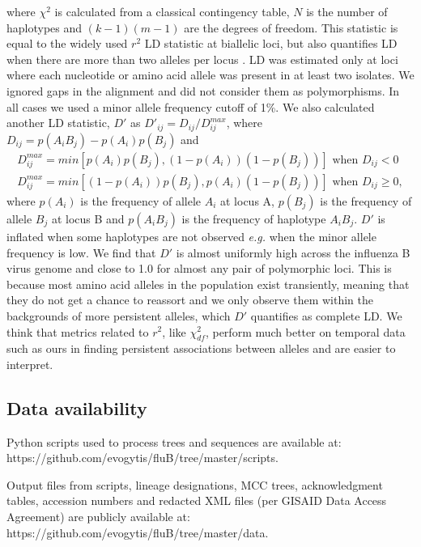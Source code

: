 \documentclass[11pt,oneside,letterpaper]{article}
\newcommand{\chiSq}{\chi^{2}_{df}}
\begin{document}
where $\chi^{2}$ is calculated from a classical contingency table, $N$ is the number of haplotypes and $(k-1)(m-1)$ are the degrees of freedom.
This statistic is equal to the widely used $r^2$ LD statistic at biallelic loci, but also quantifies LD when there are more than two alleles per locus \citep{zhao2005}.
LD was estimated only at loci where each nucleotide or amino acid allele was present in at least two isolates.
We ignored gaps in the alignment and did not consider them as polymorphisms.
In all cases we used a minor allele frequency cutoff of 1\%.
We also calculated another LD statistic, $D'$ \citep{lewontin1964} as $D'_{ij}=D_{ij}/D_{ij}^{max}$,
where $D_{ij}=p(A_i B_j) - p(A_i) p(B_j)$ and
\begin{equation}
\begin{split}
D_{ij}^{max}=min[ p(A_i) p(B_j) , (1-p(A_i))(1-p(B_j)) ] \mbox{ when } D_{ij} < 0\\
D_{ij}^{max}=min[ (1-p(A_i)) p(B_j) , p(A_i)(1-p(B_j)) ] \mbox{ when } D_{ij} \geq 0,
\end{split}
\end{equation}
where $p(A_i)$ is the frequency of allele $A_i$ at locus A, $p(B_j)$ is the frequency of allele $B_j$ at locus B and $p(A_i B_j)$ is the frequency of haplotype $A_i B_j$.
$D'$ is inflated when some haplotypes are not observed \textit{e.g.} when the minor allele frequency is low.
We find that $D'$ is almost uniformly high across the influenza B virus genome and close to 1.0 for almost any pair of polymorphic loci.
This is because most amino acid alleles in the population exist transiently, meaning that they do not get a chance to reassort and we only observe them within the backgrounds of more persistent alleles, which $D'$ quantifies as complete LD.
We think that metrics related to $r^2$, like $\chiSq$, perform much better on temporal data such as ours in finding persistent associations between alleles and are easier to interpret.

\subsection*{Data availability}
Python scripts used to process trees and sequences are available at:
\\https://github.com/evogytis/fluB/tree/master/scripts.

Output files from scripts, lineage designations, MCC trees, acknowledgment tables, accession numbers and redacted XML files (per GISAID Data Access Agreement) are publicly available at:
\\https://github.com/evogytis/fluB/tree/master/data.
\end{document}
